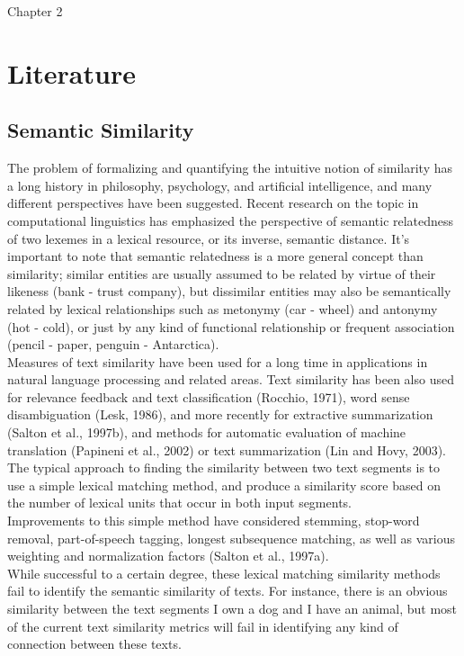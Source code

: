  Chapter 2

\chapter{Literature} %

\label{literature} %


\section{Semantic Similarity}
The problem of formalizing and quantifying the intuitive notion of similarity has a long history in philosophy, psychology, and artificial intelligence, and many different perspectives have been suggested. Recent research on the topic in computational linguistics has emphasized the perspective of semantic relatedness of two lexemes in a lexical resource, or its inverse, semantic distance. It’s important to note that semantic relatedness is a more general concept than similarity; similar entities are usually assumed to be related by virtue of their likeness (bank - trust company), but dissimilar entities may also be semantically related by lexical relationships such as metonymy (car - wheel) and antonymy (hot - cold), or just by any kind of functional relationship or frequent association (pencil - paper, penguin - Antarctica).\\

Measures of text similarity have been used for a long time in applications in natural language processing and related areas. Text similarity has been also used for relevance feedback and text classification (Rocchio, 1971), word sense disambiguation (Lesk, 1986), and more recently for extractive summarization (Salton et al., 1997b), and methods for automatic evaluation of machine translation (Papineni et al., 2002) or text summarization (Lin and Hovy, 2003). \\
The typical approach to finding the similarity between two text segments is to use a simple lexical matching method, and produce a similarity score based on the number of lexical units that occur in both input segments. \\
Improvements to this simple method have considered stemming, stop-word removal, part-of-speech tagging, longest subsequence matching, as well as various weighting and normalization factors (Salton et al., 1997a).\\
While successful to a certain degree, these lexical matching similarity methods fail to identify the semantic similarity of texts. For instance, there is an obvious similarity between the text segments I own a dog and I have an animal, but most of the current text similarity metrics will fail in identifying any kind of connection between these texts. \\

